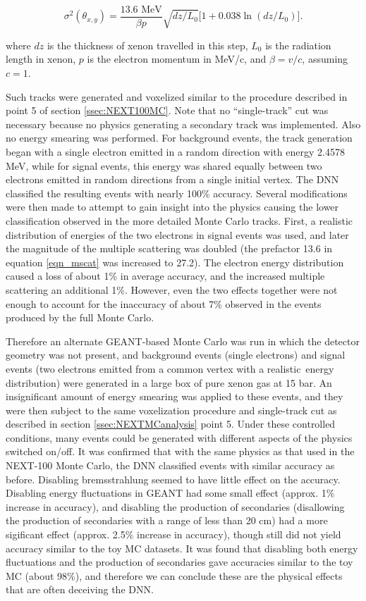 \documentclass{JINST}
\begin{document}
\begin{equation}\label{eqn_mscat}
\sigma^{2}(\theta_{x,y}) = \frac{13.6\,\,\mathrm{MeV}}{\beta p}\sqrt{dz/L_{0}}\bigl[1 + 0.038\ln(dz/L_{0})\bigr].
\end{equation}

\noindent where $dz$ is the thickness of xenon travelled in this step, $L_{0}$ is the radiation length in xenon, $p$ is the electron momentum in MeV/c, and $\beta = v/c$, assuming $c = 1$.

Such tracks were generated and voxelized similar to the procedure described in point 5 of section \ref{ssec:NEXT100MC}.  Note that no ``single-track'' cut was necessary because no
physics generating a secondary track was implemented.  Also no energy smearing was performed.  For background events, the track generation began with a single electron emitted in a
random direction with energy 2.4578 MeV, while for signal events, this energy was shared equally between two electrons emitted in random directions from a single initial vertex.  The DNN
classified the resulting events with nearly 100\% accuracy.  Several modifications were then made to attempt to gain insight into the physics causing the lower classification observed in the
more detailed Monte Carlo tracks.  First, a realistic distribution of energies of the two electrons in signal events \cite{Ponkratenko_2000} was used, and later the magnitude of the multiple scattering was doubled (the prefactor 13.6 in equation \ref{eqn_mscat} was increased to 27.2).  The electron energy distribution caused a loss of about 1\% in average accuracy, and the
increased multiple scattering an additional 1\%.  However, even the two effects together were not enough to account for the inaccuracy of about 7\% observed in the events produced by the
full Monte Carlo.

Therefore an alternate GEANT-based Monte Carlo was run in which the detector geometry was not present, and background events (single electrons) and signal events (two electrons emitted
from a common vertex with a realistic \bbonu\,energy distribution) were generated in a large box of pure xenon gas at 15 bar.  An insignificant amount of energy smearing was applied to these
events, and they were then subject to the same voxelization procedure and single-track cut as described in section \ref{ssec:NEXTMCanalysis} point 5.  Under these controlled conditions, many 
events could be generated with different aspects of the physics switched on/off.  It was confirmed that with the same physics as that used in the NEXT-100 Monte Carlo, the DNN classified events 
with similar accuracy as before.  Disabling bremsstrahlung seemed to have little effect on the accuracy.  Disabling energy fluctuations in GEANT had some small effect (approx. 1\% increase in
accuracy), and disabling the production of secondaries (disallowing the production of secondaries with a range of less than 20 cm) had a more sigificant effect (approx. 2.5\% increase in accuracy),
though still did not yield accuracy similar to the toy MC datasets.  It was found that disabling both energy fluctuations and the production of secondaries gave accuracies similar to the toy MC
(about 98\%), and therefore we can conclude these are the physical effects that are often deceiving the DNN.
\end{document}
